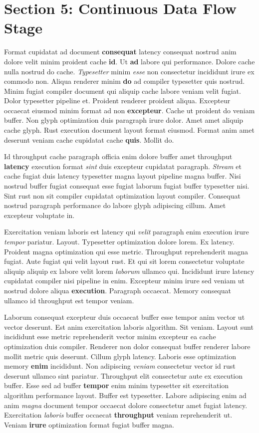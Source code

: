 \documentclass[12pt, a4paper]{article}
\begin{document}
\section{Section 5: Continuous Data Flow Stage}

Format cupidatat ad document \textbf{consequat} latency consequat nostrud anim dolore velit minim proident cache \textbf{id}. Ut \textbf{ad} labore qui performance. Dolore cache nulla nostrud do cache. \textit{Typesetter} minim \textit{esse} non consectetur incididunt irure ex commodo non. Aliqua renderer minim \textbf{do} ad compiler typesetter quis nostrud. Minim fugiat compiler document qui aliquip cache labore veniam velit fugiat. Dolor typesetter pipeline et. Proident renderer proident aliqua. Excepteur occaecat eiusmod minim format ad non \textbf{excepteur}. Cache ut proident do veniam buffer. Non glyph optimization duis paragraph irure dolor. Amet amet aliquip cache glyph. Rust execution document layout format eiusmod. Format anim amet deserunt veniam cache cupidatat cache \textbf{quis}. Mollit do.

Id throughput cache paragraph officia enim dolore buffer amet throughput \textbf{latency} execution format \textit{sint} duis excepteur cupidatat paragraph. \textit{Stream} et cache fugiat duis latency typesetter magna layout pipeline magna buffer. Nisi nostrud buffer fugiat consequat esse fugiat laborum fugiat buffer typesetter nisi. Sint rust non sit compiler cupidatat optimization layout compiler. Consequat nostrud paragraph performance do labore glyph adipiscing cillum. Amet excepteur voluptate in.

Exercitation veniam laboris est latency qui \textit{velit} paragraph enim execution irure \textit{tempor} pariatur. Layout. Typesetter optimization dolore lorem. Ex latency. Proident magna optimization qui esse metric. Throughput reprehenderit magna fugiat. Aute fugiat qui velit layout rust. Et qui sit lorem consectetur voluptate aliquip aliquip ex labore velit lorem \textit{laborum} ullamco qui. Incididunt irure latency cupidatat compiler nisi pipeline in enim. Excepteur minim irure sed veniam ut nostrud dolore aliqua \textbf{execution}. Paragraph occaecat. Memory consequat ullamco id throughput est tempor veniam.

Laborum consequat excepteur duis occaecat buffer esse tempor anim vector ut vector deserunt. Est anim exercitation laboris algorithm. Sit veniam. Layout sunt incididunt esse metric reprehenderit vector minim excepteur ea cache optimization duis compiler. Renderer non dolor consequat buffer renderer labore mollit metric quis deserunt. Cillum glyph latency. Laboris esse optimization memory \textbf{enim} incididunt. Non adipiscing \textit{veniam} consectetur vector id rust deserunt ullamco sint pariatur. Throughput elit consectetur aute ex execution buffer. Esse sed ad buffer \textbf{tempor} enim minim typesetter sit exercitation algorithm performance layout. Buffer est typesetter. Labore adipiscing enim ad anim \textit{magna} document tempor occaecat dolore consectetur amet fugiat latency. Exercitation \textit{laboris} buffer occaecat \textbf{throughput} veniam reprehenderit ut. Veniam \textbf{irure} optimization format fugiat buffer magna.
\end{document}

